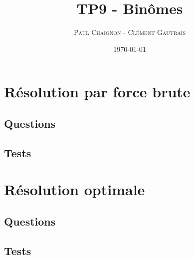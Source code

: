 \documentclass[a4paper,12pt]{article}
\title{TP9 - Binômes}
\author{\textsc{Paul Chaignon} - \textsc{Clément Gautrais}}
\date{\today}
\begin{document}
\maketitle

\section{Résolution par force brute}

\subsection{Questions}


\vspace{2cm}

\subsection{Tests}


\vspace{3cm}


\section{Résolution optimale}

\subsection{Questions}


\vspace{2cm}

\subsection{Tests}


\end{document}
